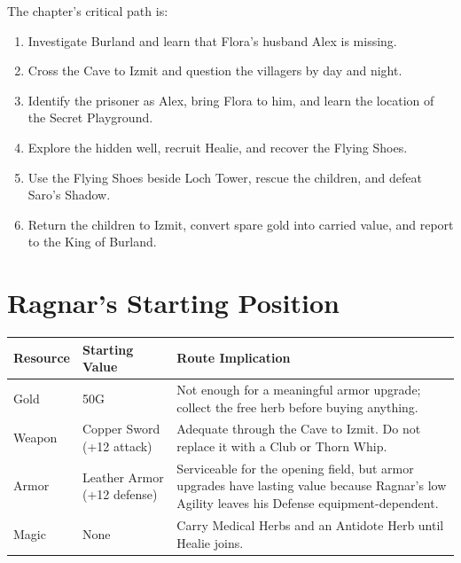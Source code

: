 \documentclass[
  american,
  10pt,
  letterpaper,
  oneside,
  open=any]{scrreprt}
\newcounter{none} %
\providecommand{\tightlist}{%
  \setlength{\itemsep}{0pt}\setlength{\parskip}{0pt}}
\newenvironment{guidetable}{%
  \small\setstretch{1.0}%
  \setlength{\tabcolsep}{4pt}%
  \setlength{\LTpre}{8pt}\setlength{\LTpost}{10pt}%
  \renewcommand{\arraystretch}{1.16}%
}{ }
\begin{document}
The chapter's critical path is:

\begin{enumerate}
\def\labelenumi{\arabic{enumi}.}
\tightlist
\item
  Investigate Burland and learn that Flora's husband Alex is missing.
\item
  Cross the Cave to Izmit and question the villagers by day and night.
\item
  Identify the prisoner as Alex, bring Flora to him, and learn the
  location of the Secret Playground.
\item
  Explore the hidden well, recruit Healie, and recover the Flying Shoes.
\item
  Use the Flying Shoes beside Loch Tower, rescue the children, and
  defeat Saro's Shadow.
\item
  Return the children to Izmit, convert spare gold into carried value,
  and report to the King of Burland.
\end{enumerate}

\section{Ragnar's Starting Position}\label{ragnars-starting-position}

\begin{guidetable}

{\def\LTcaptype{none} %
\begin{longtable}[]{@{}
  >{\raggedright\arraybackslash}p{}
  >{\raggedleft\arraybackslash}p{}
  >{\raggedright\arraybackslash}p{}@{}}
\toprule\noalign{}
\begin{minipage}[b]{\linewidth}\raggedright
\color{GuideGreen}\bfseries Resource
\end{minipage} & \begin{minipage}[b]{\linewidth}\raggedleft
\color{GuideGreen}\bfseries Starting Value
\end{minipage} & \begin{minipage}[b]{\linewidth}\raggedright
\color{GuideGreen}\bfseries Route Implication
\end{minipage} \\
\midrule\noalign{}
\endhead
\bottomrule\noalign{}
\endlastfoot
Gold & 50G & Not enough for a meaningful armor upgrade; collect the free
herb before buying anything. \\
Weapon & Copper Sword (+12 attack) & Adequate through the Cave to Izmit.
Do not replace it with a Club or Thorn Whip. \\
Armor & Leather Armor (+12 defense) & Serviceable for the opening field,
but armor upgrades have lasting value because Ragnar's low Agility
leaves his Defense equipment-dependent. \\
Magic & None & Carry Medical Herbs and an Antidote Herb until Healie
joins. \\
\end{longtable}
}

\end{guidetable}
\end{document}
